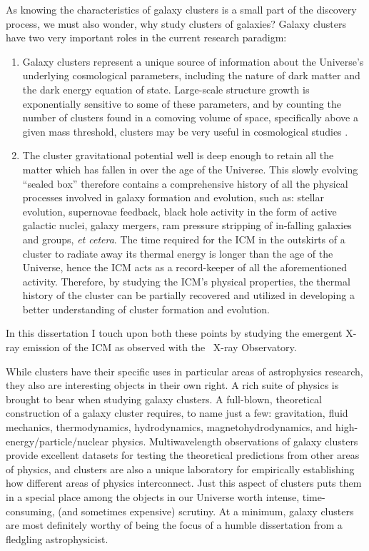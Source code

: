 As knowing the characteristics of galaxy clusters is a small part of
the discovery process, we must also wonder, why study clusters of
galaxies? Galaxy clusters have two very important roles in the current
research paradigm:
\begin{enumerate}
\item Galaxy clusters represent a unique source of information about
  the Universe's underlying cosmological parameters, including the
  nature of dark matter and the dark energy equation of
  state. Large-scale structure growth is exponentially sensitive to
  some of these parameters, and by counting the number of clusters
  found in a comoving volume of space, specifically above a given mass
  threshold, clusters may be very useful in cosmological studies
  \citep{voitreview}.
\item The cluster gravitational potential well is deep enough to
  retain all the matter which has fallen in over the age of the
  Universe. This slowly evolving ``sealed box'' therefore contains a
  comprehensive history of all the physical processes involved in
  galaxy formation and evolution, such as: stellar evolution,
  supernovae feedback, black hole activity in the form of active
  galactic nuclei, galaxy mergers, ram pressure stripping of
  in-falling galaxies and groups, {\it{et cetera}}. The time required
  for the ICM in the outskirts of a cluster to radiate away its
  thermal energy is longer than the age of the Universe, hence the ICM
  acts as a record-keeper of all the aforementioned activity.
  Therefore, by studying the ICM's physical properties, the thermal
  history of the cluster can be partially recovered and utilized in
  developing a better understanding of cluster formation and
  evolution.
\end{enumerate}
In this dissertation I touch upon both these points by studying the
emergent X-ray emission of the ICM as observed with the \chandra\
X-ray Observatory.

While clusters have their specific uses in particular areas of
astrophysics research, they also are interesting objects in their own
right. A rich suite of physics is brought to bear when studying galaxy
clusters. A full-blown, theoretical construction of a galaxy cluster
requires, to name just a few: gravitation, fluid mechanics,
thermodynamics, hydrodynamics, magnetohydrodynamics, and
high-energy/particle/nuclear physics. Multiwavelength observations of
galaxy clusters provide excellent datasets for testing the theoretical
predictions from other areas of physics, and clusters are also a
unique laboratory for empirically establishing how different areas of
physics interconnect. Just this aspect of clusters puts them in a
special place among the objects in our Universe worth intense,
time-consuming, (and sometimes expensive) scrutiny. At a minimum,
galaxy clusters are most definitely worthy of being the focus of a
humble dissertation from a fledgling astrophysicist.

